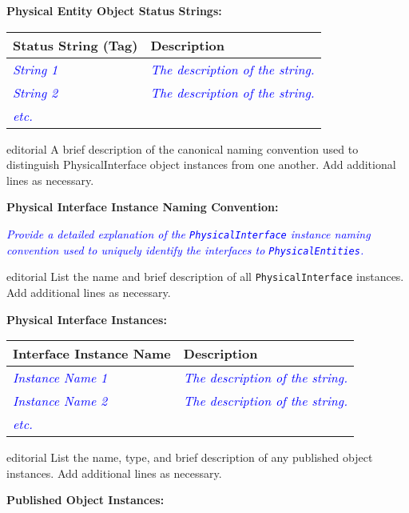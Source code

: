 \documentclass[11pt,english,letterpaper]{article}
\newcommand{\example}[1]{{\textcolor{blue}{\textit{#1}}}}
\begin{document}
\textbf{Physical Entity Object Status Strings: }

\begin{tabularx}{\textwidth}{|l|X|} \hline
Status String (Tag) & Description \\ \hline
\example{String 1} & \example{The description of the string.} \\ \hline
\example{String 2} & \example{The description of the string.} \\ \hline
\example{etc.} &  \\ \hline
\end{tabularx}

\begin{shownto}{editorial}
{\color{red} A brief description of the canonical naming convention used
to distinguish PhysicalInterface object instances from one another. Add
additional lines as necessary.}
\end{shownto}

\textbf{Physical Interface Instance Naming Convention: }

\example{Provide a detailed explanation of the \texttt{PhysicalInterface}
instance naming convention used to uniquely identify the interfaces to
\texttt{PhysicalEntities}.}

\begin{shownto}{editorial}
{\color{red} List the name and brief description of all \texttt{PhysicalInterface}
instances. Add additional lines as necessary.}
\end{shownto}

\textbf{Physical Interface Instances: }

\begin{tabularx}{\textwidth}{|l|X|} \hline
Interface Instance Name & Description \\ \hline
\example{Instance Name 1} & 
\example{The description of the string.} \\ \hline
\example{Instance Name 2} & 
\example{The description of the string.} \\ \hline
\example{etc.} & \\ \hline
\end{tabularx}

\begin{shownto}{editorial}
{\color{red} List the name, type, and brief description of any published
object instances. Add additional lines as necessary.}
\end{shownto}

\textbf{Published Object Instances: }
\end{document}
